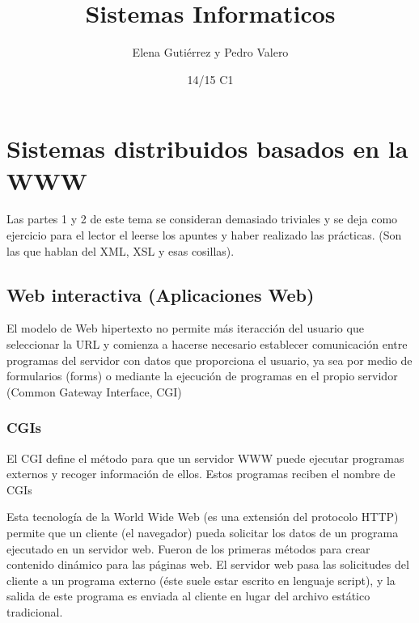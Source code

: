 \documentclass{apuntes}
\title{Sistemas Informaticos}
\author{Elena Gutiérrez y Pedro Valero}
\date{14/15 C1}
\begin{document}
\pagestyle{plain}
\maketitle

\tableofcontents
\newpage
\setcounter{chapter}{1}
\chapter{Sistemas distribuidos basados en la WWW}

Las partes 1 y 2 de este tema se consideran demasiado triviales y se deja como ejercicio para el lector el leerse los apuntes y haber realizado las prácticas. (Son las que hablan del XML, XSL y esas cosillas).

\setcounter{section}{2}
\section{Web interactiva (Aplicaciones Web)}
El modelo de Web hipertexto no permite más iteracción del usuario que seleccionar la URL y comienza a hacerse necesario establecer comunicación entre programas del servidor con datos que proporciona el usuario, ya sea por medio de formularios (forms) o mediante la ejecución de programas en el propio servidor (Common Gateway Interface, CGI)

\subsection{CGIs}
\begin{defn}[CGI]
El CGI define el método para que un servidor WWW puede ejecutar programas externos y recoger información de ellos. Estos programas reciben el nombre de CGIs
\end{defn}

Esta tecnología de la World Wide Web (es una extensión del protocolo HTTP) permite que un cliente (el navegador) pueda solicitar los datos de un programa ejecutado en un servidor web. Fueron de los primeras métodos para crear contenido dinámico para las páginas web. El servidor web pasa las solicitudes del cliente a un programa externo (éste suele estar escrito en lenguaje script), y la salida de este programa es enviada al cliente en lugar del archivo estático tradicional.
\end{document}
